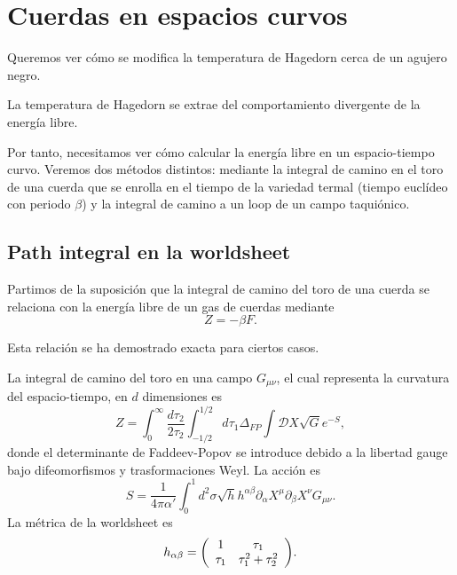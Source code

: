 \chapter{Cuerdas en espacios curvos}

Queremos ver cómo se modifica la temperatura de Hagedorn cerca de un agujero negro.

La temperatura de Hagedorn se extrae del comportamiento divergente de la energía libre.


Por tanto, necesitamos ver cómo calcular la energía libre en un espacio-tiempo curvo.
Veremos dos métodos distintos: mediante la integral de camino en el toro de una cuerda
que se enrolla en el tiempo de la variedad termal (tiempo euclídeo con periodo $\beta$) y
la integral de camino a un loop de un campo taquiónico.

\section{Path integral en la worldsheet}

Partimos de la suposición que la integral de camino del toro de una cuerda se relaciona
con la energía libre de un gas de cuerdas mediante
\begin{equation}
  Z =  -\beta F.
\end{equation}

Esta relación se ha demostrado exacta para ciertos casos.


La integral de camino del toro en una campo $G_{\mu\nu}$, el cual representa la curvatura
del espacio-tiempo, en $d$ dimensiones es
\begin{equation}
  Z=\int_0^\infty \frac{d\tau_2}{2\tau_2} \int_{-1/2}^{1/2} d\tau_1 \Delta_{FP} \int \mathcal DX
  \sqrt G e^{-S},
  \label{eq:toruspi}
\end{equation}
donde el determinante de Faddeev-Popov se introduce debido a la libertad gauge bajo difeomorfismos
y trasformaciones Weyl.
La acción es 
\begin{equation}
  S= \frac{1}{4\pi \alpha'}\int_{0}^{1} d^2\sigma \sqrt h h^{\alpha\beta} \partial_\alpha X^\mu\partial_\beta X^\nu G_{\mu\nu}.
\end{equation}
La métrica de la worldsheet es
\begin{equation}
  h_{\alpha\beta} =
\qty(
\begin{array}{cc}
  1 & \tau_1 \\
  \tau_1 & \tau_1^2+\tau_2^2
\end{array}
).
\end{equation}

